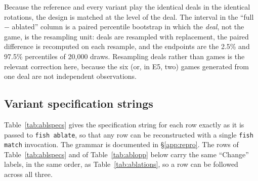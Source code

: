 \documentclass[11pt]{article}
\theoremstyle{definition}
\newcommand{\numBootstrapDraws}{20{,}000}
\begin{document}
Because the reference and every variant play the identical deals in the
identical rotations, the design is matched at the level of the deal. The
interval in the ``full $-$ ablated'' column is a paired percentile bootstrap in
which the \emph{deal}, not the game, is the resampling unit: deals are resampled
with replacement, the paired difference is recomputed on each resample, and the
endpoints are the 2.5\% and 97.5\% percentiles of \numBootstrapDraws{} draws.
Resampling
deals rather than games is the relevant correction here, because the six (or, in
E5, two) games generated from one deal are not independent observations.

\begin{center}
\end{center}

\subsection{Variant specification strings}
\label{app:abl-specs}

Table~\ref{tab:ablspecs} gives the specification string for each row exactly as
it is passed to \texttt{fish ablate}, so that any row can be reconstructed with
a single \texttt{fish match} invocation. The grammar is documented in
\S\ref{app:repro}. The rows of Table~\ref{tab:ablspecs} and of
Table~\ref{tab:ablopp} below carry the same ``Change'' labels, in the same
order, as Table~\ref{tab:ablations}, so a row can be followed across all three.
\end{document}
